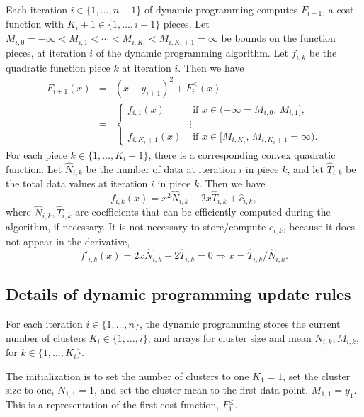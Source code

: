 \documentclass[12pt]{article}
\begin{document}
Each iteration $i\in\{1,\dots,n-1\}$ of dynamic programming computes $F_{i+1}$, a cost function with $K_i+1\in\{1,\dots,i+1\}$ pieces.
Let $M_{i,0}=-\infty < M_{i,1} < \cdots < M_{i, K_i} < M_{i, K_i+1}=\infty$ be bounds on the function pieces, at iteration $i$ of the dynamic programming algorithm.
Let $f_{i,k}$ be the quadratic function piece $k$ at iteration $i$.
Then we have
\begin{eqnarray}
  \label{eq:update}
  F_{i+1}(x) &=& (x-y_{i+1})^2 + F_i^\leq(x) \\
  &=&
      \begin{cases}
        f_{i,1}(x) &\text{ if } x\in(-\infty=M_{i,0},\, M_{i,1}],\\
         &\vdots\\
        f_{i,K_i+1}(x) &\text{ if } x\in[M_{i,K_i},\, M_{i,K_i+1}=\infty).
      \end{cases}
\end{eqnarray}
For each piece $k\in\{1,\dots,K_i+1\}$, there is a corresponding convex quadratic function.
Let $\hat N_{i,k}$ be the number of data at iteration $i$ in piece $k$, and let $\hat T_{i,k}$ be the total data values at iteration $i$ in piece $k$.
Then we have
\begin{equation}
  \label{eq:fik}
  f_{i,k}(x) = x^2\hat N_{i,k}  -2 x\hat T_{i,k}  + \hat c_{i,k},
\end{equation}
where $\hat N_{i,k}, \hat T_{i,k}$ are coefficients that can be efficiently computed during the algorithm, if necessary.
It is not necessary to store/compute $\hat c_{i,k}$, because it does not appear in the derivative,
\begin{equation}
  \label{eq:fik_deriv}
  f'_{i,k}(x) = 2x\hat N_{i,k}  -2\hat T_{i,k} = 0 \Rightarrow x=\hat T_{i,k}/\hat N_{i,k}.
\end{equation}

\subsection{Details of dynamic programming update rules}

For each iteration $i\in\{1, \dots, n\}$, the dynamic programming stores the current number of clusters $K_i\in\{1,\dots,i\}$, and arrays for cluster size and mean $N_{i,k},M_{i,k}$, for $k\in\{1,\dots,K_i\}$.

The initialization is to set the number of clusters to one $K_1=1$, set the cluster size to one, $N_{1,1}=1$, and set the cluster mean to the first data point, $M_{1,1}=y_1$.
This is a representation of the first cost function, $F_1^\leq$.
\end{document}
